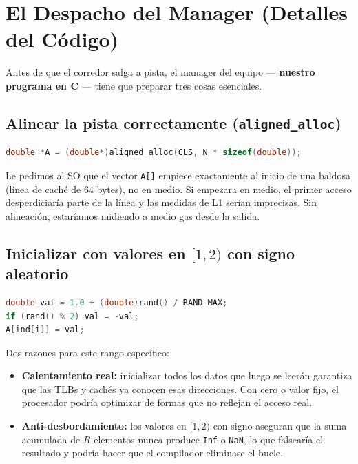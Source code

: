 \documentclass[12pt,a4paper]{article}
\begin{document}
\section{El Despacho del Manager (Detalles del Código)}
\label{sec:codigo}

Antes de que el corredor salga a pista, el manager del equipo --- \textbf{nuestro programa en C} --- tiene que preparar tres cosas esenciales.

\subsection{Alinear la pista correctamente (\texttt{aligned\_alloc})}

\begin{lstlisting}[language=C, caption={Reserva alineada al inicio de línea de caché}]
double *A = (double*)aligned_alloc(CLS, N * sizeof(double));
\end{lstlisting}

Le pedimos al SO que el vector \texttt{A[]} empiece exactamente al inicio de una baldosa (línea de caché de 64 bytes), no en medio. Si empezara en medio, el primer acceso desperdiciaría parte de la línea y las medidas de L1 serían imprecisas. Sin alineación, estaríamos midiendo a medio gas desde la salida.

\subsection{Inicializar con valores en $[1, 2)$ con signo aleatorio}

\begin{lstlisting}[language=C, caption={Inicialización anti-desbordamiento y calentamiento real}]
double val = 1.0 + (double)rand() / RAND_MAX;
if (rand() % 2) val = -val;
A[ind[i]] = val;
\end{lstlisting}

Dos razones para este rango específico:
\begin{itemize}[leftmargin=1.5em]
  \item \textbf{Calentamiento real:} inicializar todos los datos que luego se leerán garantiza que las TLBs y cachés ya conocen esas direcciones. Con cero o valor fijo, el procesador podría optimizar de formas que no reflejan el acceso real.
  \item \textbf{Anti-desbordamiento:} los valores en $[1, 2)$ con signo aseguran que la suma acumulada de $R$ elementos nunca produce \texttt{Inf} o \texttt{NaN}, lo que falsearía el resultado y podría hacer que el compilador eliminase el bucle.
\end{itemize}
\end{document}
